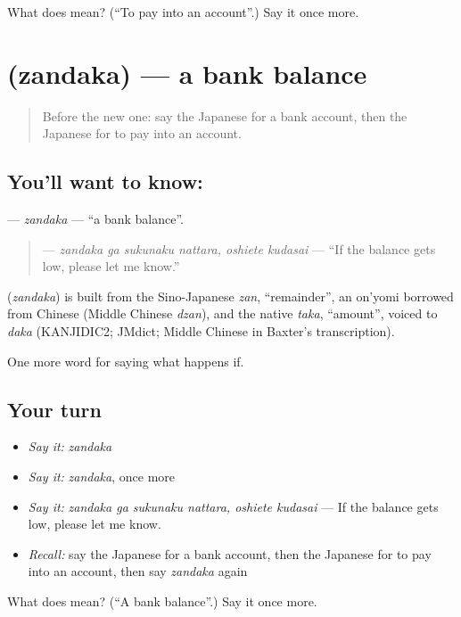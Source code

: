 \begin{tcolorbox}[breakable,colback=teal!4,colframe=teal!35!black,title={Before you move on}]
What does  mean? (\textquotedblleft{}To pay into an account\textquotedblright{}.) Say it once more.
\end{tcolorbox}
\section[\texorpdfstring{\ja{ざんだか} (zandaka)}{ざんだか (zandaka)}]{ (zandaka) — a bank balance}

\label{lesson:JA-C358-zandaka}



\begin{quote}
Before the new one: say the Japanese for a bank account, then the Japanese for to pay into an account.
\end{quote}

\subsection*{You'll want to know: }
\textbf{} — \emph{zandaka} — \textquotedblleft{}a bank balance\textquotedblright{}.

\begin{quote}
\textbf{   } — \emph{zandaka ga sukunaku nattara, oshiete kudasai} — \textquotedblleft{}If the balance gets low, please let me know.\textquotedblright{}
\end{quote}

\begin{cousinweb}
\textbf{} (\emph{zandaka}) is built from the Sino-Japanese \emph{zan}, \textquotedblleft{}remainder\textquotedblright{}, an on'yomi borrowed from Chinese (Middle Chinese \emph{dzan}), and the native \emph{taka}, \textquotedblleft{}amount\textquotedblright{}, voiced to \emph{daka} (KANJIDIC2; JMdict; Middle Chinese in Baxter's transcription).
\end{cousinweb}

\begin{grammarlens}[title={What you've built}]
One more word for saying what happens if.
\end{grammarlens}

\subsection*{Your turn}
\begin{itemize}
\raggedright
  \item \emph{Say it:} \emph{zandaka}
  \item \emph{Say it:} \emph{zandaka}, once more
  \item \emph{Say it:} \emph{zandaka ga sukunaku nattara, oshiete kudasai} — If the balance gets low, please let me know.
  \item \emph{Recall:} say the Japanese for a bank account, then the Japanese for to pay into an account, then say \emph{zandaka} again
\end{itemize}

\begin{tcolorbox}[breakable,colback=teal!4,colframe=teal!35!black,title={Before you move on}]
What does  mean? (\textquotedblleft{}A bank balance\textquotedblright{}.) Say it once more.
\end{tcolorbox}
